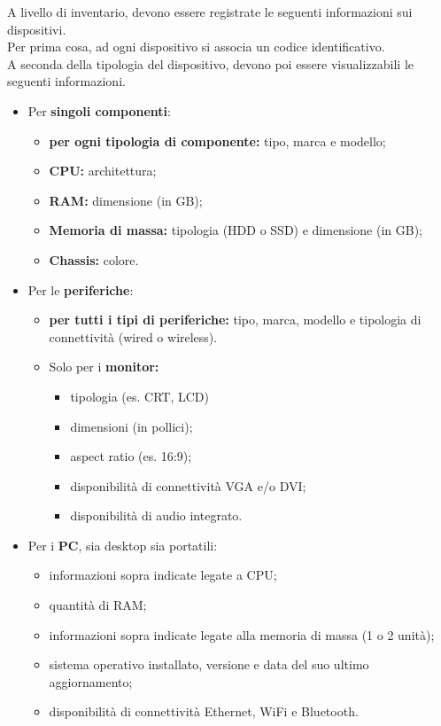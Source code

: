 \documentclass[a4paper,12pt]{report}
\begin{document}
A livello di inventario, devono essere registrate le seguenti informazioni sui dispositivi. \\
Per prima cosa, ad ogni dispositivo si associa un codice identificativo. \\
A seconda della tipologia del dispositivo, devono poi essere visualizzabili le seguenti informazioni.
\begin{itemize}
	\item Per \textbf{singoli componenti}:
		\begin{itemize}
			\item \textbf{per ogni tipologia di componente:} tipo, marca e modello;
			\item \textbf{CPU:} architettura;
			\item \textbf{RAM:} dimensione (in GB);
			\item \textbf{Memoria di massa:} tipologia (HDD o SSD) e dimensione (in GB);
			\item \textbf{Chassis:} colore.
		\end{itemize}
	\item Per le \textbf{periferiche}:
		\begin{itemize}
			\item \textbf{per tutti i tipi di periferiche:} tipo, marca, modello e tipologia di connettività (wired o wireless).
			\item Solo per i \textbf{monitor:}
				\begin{itemize}
					\item tipologia (es. CRT, LCD)
					\item dimensioni (in pollici);
					\item aspect ratio (es. 16:9);
					\item disponibilità di connettività VGA e/o DVI;
					\item disponibilità di audio integrato.
				\end{itemize}
		\end{itemize}
	\item Per i \textbf{PC}, sia desktop sia portatili:
		\begin{itemize}
			\item informazioni sopra indicate legate a CPU;
            \item quantità di RAM;
            \item informazioni sopra indicate legate alla memoria di massa (1 o 2 unità);
			\item sistema operativo installato, versione e data del suo ultimo aggiornamento;
			\item disponibilità di connettività Ethernet, WiFi e Bluetooth.

\end{itemize}
\end{itemize}
\end{document}
